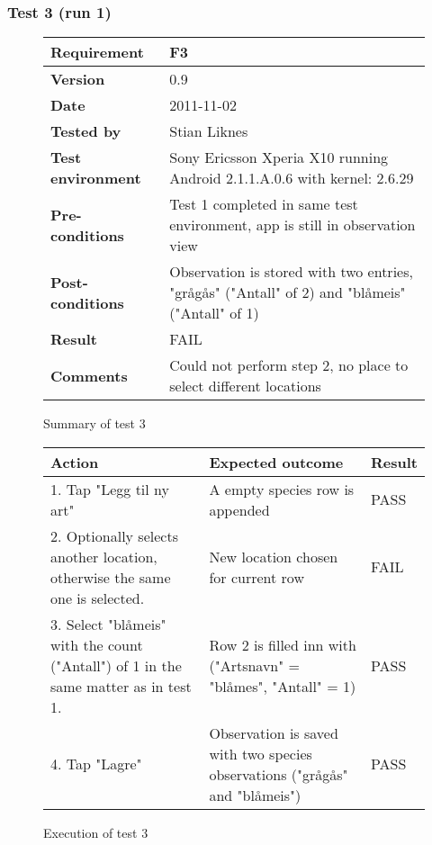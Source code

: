 \newpage
\subsubsection{Test 3 (run 1)}

	\begin{figure}[htb]
		\centering
		\begin{tabular}{|p{3.5cm}|p{7.0cm}|} \hline
			\textbf{Requirement} & F3 \\ \hline
			\textbf{Version} & 0.9 \\ \hline
			\textbf{Date} & 2011-11-02 \\ \hline
			\textbf{Tested by} & Stian Liknes \\ \hline
			\textbf{Test environment} & Sony Ericsson Xperia X10 running Android 2.1.1.A.0.6 with kernel: 2.6.29 \\ \hline
			\textbf{Pre-conditions} & Test 1 completed in same test environment, app is still in observation view \\ \hline
			\textbf{Post-conditions} & Observation is stored with two entries, "grågås" ("Antall" of 2) and "blåmeis" ("Antall" of 1) \\ \hline
			\textbf{Result} & FAIL \\ \hline
			\textbf{Comments} & Could not perform step 2, no place to select different locations \\ \hline
		\end{tabular}
		\caption{Summary of test 3}
	\end{figure}

	\begin{figure}[htb]
		\centering
		\begin{tabular}{|p{5.0cm}|p{5.0cm}|p{1cm}|}
			\hline \textbf{Action} & \textbf{Expected outcome} & \textbf{Result} \\ \hline

			1. Tap "Legg til ny art" &
			A empty species row is appended &
			PASS \\ \hline
			
			2. Optionally selects another location, otherwise the same one is
			selected. & 
			New location chosen for current row &
			FAIL \\ \hline

			3. Select "blåmeis" with the count ("Antall") of 1 in the same matter 
			as in test 1. &
			Row 2 is filled inn with ("Artsnavn" = "blåmes", "Antall" = 1) &
			PASS \\ \hline

			4. Tap "Lagre" &
			Observation is saved with two species observations ("grågås" and "blåmeis") &
			PASS \\ \hline
		\end{tabular}
		\caption{Execution of test 3}
	\end{figure}

